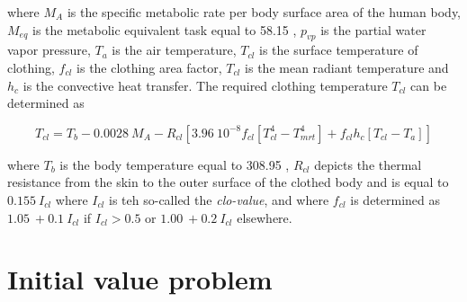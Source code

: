 where $M_{A}$ is the specific metabolic rate per body surface area of the human body, $M_{eq}$ is the metabolic equivalent task equal to 58.15 \watt\rpsquare\metre, $p_{vp}$ is the partial water vapor pressure, $T_{a}$ is the air temperature, $T_{cl}$ is the surface temperature of clothing, $f_{cl}$ is the clothing area factor, $T_{cl}$ is the mean radiant temperature and $h_{c}$ is the convective heat transfer. The required clothing temperature $T_{cl}$ can be determined as

\begin{dmath}
T_{cl} = T_{b} - 0.0028\ M_{A} - R_{cl} \left[ 3.96\ 10^{-8} f_{cl} \left[ T_{cl}^{4} - T_{mrt}^{4} \right] + f_{cl} h_{c} \left[ T_{cl} - T_{a} \right] \right]
\end{dmath}

where $T_{b}$ is the body temperature equal to 308.95 \kelvin, $R_{cl}$ depicts the thermal resistance from the skin to the outer surface of the clothed body and is equal to $0.155\ I_{cl}$ where $I_{cl}$ is teh so-called the \emph{clo-value}, and where $f_{cl}$ is determined as $1.05\ + 0.1\ I_{cl}$ if $I_{cl} > 0.5$ or $1.00\ + 0.2\ I_{cl}$ elsewhere.

\section{Initial value problem}

{{}}






